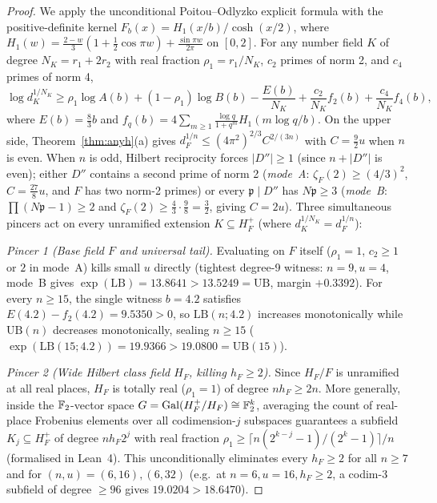 \documentclass[11pt]{amsart}
\numberwithin{equation}{section}
\theoremstyle{plain}
\theoremstyle{definition}\newtheorem{definition}[theorem]{Definition}
\theoremstyle{remark}\newtheorem{remark}[theorem]{Remark}
\begin{document}
\begin{proof}
We apply the unconditional Poitou--Odlyzko explicit formula \cite{poitou77,odlyzko76,odlyzko90} with the positive-definite kernel $F_b(x)=H_1(x/b)/\cosh(x/2)$, where $H_1(w)=\frac{2-w}{3}(1+\frac12\cos\pi w)+\frac{\sin\pi w}{2\pi}$ on $[0,2]$. For any number field $K$ of degree $N_K=r_1+2r_2$ with real fraction $\rho_1=r_1/N_K$, $c_2$ primes of norm 2, and $c_4$ primes of norm 4,
\[\log d_K^{1/N_K}\ge\rho_1\log A(b)+(1-\rho_1)\log B(b)-\frac{E(b)}{N_K}+\frac{c_2}{N_K}f_2(b)+\frac{c_4}{N_K}f_4(b),\]
where $E(b)=\frac83b$ and $f_q(b)=4\sum_{m\ge1}\frac{\log q}{1+q^m}H_1(m\log q/b)$. On the upper side, Theorem~\ref{thm:anyh}(a) gives $d_F^{1/n}\le(4\pi^2)^{2/3}C^{2/(3n)}$ with $C=\frac92u$ when $n$ is even. When $n$ is odd, Hilbert reciprocity forces $|D''|\ge1$ (since $n+|D''|$ is even); either $D''$ contains a second prime of norm 2 (\emph{mode~A}: $\zeta_F(2)\ge(4/3)^2$, $C=\frac{27}{8}u$, and $F$ has two norm-2 primes) or every $\mathfrak p\mid D''$ has $N\mathfrak p\ge3$ (\emph{mode~B}: $\prod(N\mathfrak p-1)\ge2$ and $\zeta_F(2)\ge\frac43\cdot\frac98=\frac32$, giving $C=2u$). Three simultaneous pincers act on every unramified extension $K\subseteq H_F^+$ (where $d_K^{1/N_K}=d_F^{1/n}$):

\emph{Pincer 1 (Base field $F$ and universal tail).} Evaluating on $F$ itself ($\rho_1=1$, $c_2\ge1$ or $2$ in mode~A) kills small $u$ directly (tightest degree-9 witness: $n=9,u=4$, mode~B gives $\exp(\mathrm{LB})=13.8641>13.5249=\mathrm{UB}$, margin $+0.3392$). For every $n\ge15$, the single witness $b=4.2$ satisfies $E(4.2)-f_2(4.2)=9.5350>0$, so $\mathrm{LB}(n;4.2)$ increases monotonically while $\mathrm{UB}(n)$ decreases monotonically, sealing $n\ge15$ ($\exp(\mathrm{LB}(15;4.2))=19.9366>19.0800=\mathrm{UB}(15)$).

\emph{Pincer 2 (Wide Hilbert class field $H_F$, killing $h_F\ge2$).} Since $H_F/F$ is unramified at all real places, $H_F$ is totally real ($\rho_1=1$) of degree $n h_F\ge2n$. More generally, inside the $\mathbb{F}_2$-vector space $G=\operatorname{Gal}(H_F^+/H_F)\cong\mathbb{F}_2^k$, averaging the count of real-place Frobenius elements over all codimension-$j$ subspaces guarantees a subfield $K_j\subseteq H_F^+$ of degree $nh_F 2^j$ with real fraction $\rho_1\ge\lceil n(2^{k-j}-1)/(2^k-1)\rceil/n$ (formalised in Lean~4). This unconditionally eliminates every $h_F\ge2$ for all $n\ge7$ and for $(n,u)=(6,16),(6,32)$ (e.g.\ at $n=6,u=16,h_F\ge2$, a codim-3 subfield of degree $\ge96$ gives $19.0204>18.6470$).


\end{proof}
\end{document}
